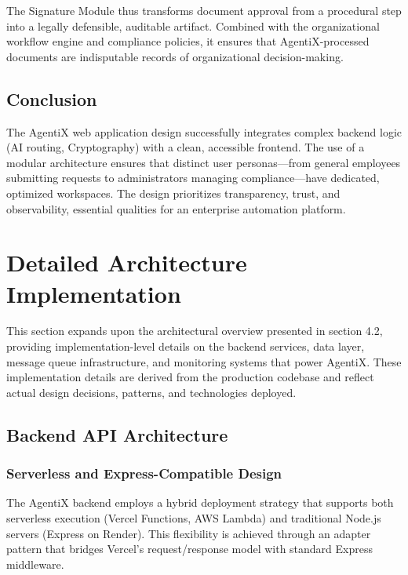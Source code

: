 \documentclass[12pt,oneside,openright,a4paper]{cpe-english-project}
\begin{document}
The Signature Module thus transforms document approval from a procedural step into a legally defensible, auditable artifact. Combined with the organizational workflow engine and compliance policies, it ensures that AgentiX-processed documents are indisputable records of organizational decision-making.

\vspace{1em}

\subsection{Conclusion}

The AgentiX web application design successfully integrates complex backend logic (AI routing, Cryptography) with a clean, accessible frontend. The use of a modular architecture ensures that distinct user personas—from general employees submitting requests to administrators managing compliance—have dedicated, optimized workspaces. The design prioritizes transparency, trust, and observability, essential qualities for an enterprise automation platform.

\newpage

\section{Detailed Architecture Implementation}

This section expands upon the architectural overview presented in section 4.2, providing implementation-level details on the backend services, data layer, message queue infrastructure, and monitoring systems that power AgentiX. These implementation details are derived from the production codebase and reflect actual design decisions, patterns, and technologies deployed.

\vspace{1em}

\subsection{Backend API Architecture}

\subsubsection{Serverless and Express-Compatible Design}

The AgentiX backend employs a hybrid deployment strategy that supports both serverless execution (Vercel Functions, AWS Lambda) and traditional Node.js servers (Express on Render). This flexibility is achieved through an adapter pattern that bridges Vercel's request/response model with standard Express middleware.
\end{document}
